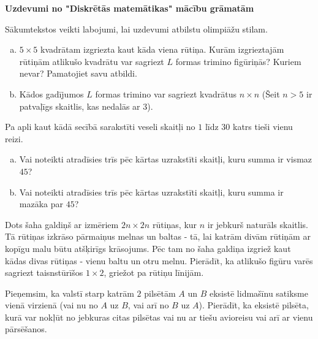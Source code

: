 \documentclass[11pt]{article}
\begin{document}
\newpage

\begin{center}
{\Large \bf Uzdevumi no "Diskrētās matemātikas" mācību grāmatām}
\end{center}

Sākumtekstos veikti labojumi, lai uzdevumi atbilstu olimpiāžu stilam.

\begin{problem}[SusannaEpp.Ch5.P32]
\begin{enumerate}[(a)]
\item $5 \times 5$ kvadrātam izgriezta kaut kāda viena rūtiņa. 
Kurām izgrieztajām rūtiņām atlikušo kvadrātu var sagriezt $L$ formas 
trimino figūriņās? Kuriem nevar? Pamatojiet savu atbildi. 
\item Kādos gadījumos $L$ formas trimino var sagriezt kvadrātus $n \times n$ (Šeit $n > 5$ 
ir patvaļīgs skaitlis, kas nedalās ar $3$). 
\end{enumerate}
\end{problem}

\begin{problem}[SusannaEpp.Ch5.P35]
Pa apli kaut kādā secībā sarakstīti veseli skaitļi no $1$ līdz $30$
katrs tieši vienu reizi. 
\begin{enumerate}[(a)]
\item Vai noteikti atradīsies trīs pēc kārtas uzrakstīti skaitļi, kuru summa ir vismaz $45$?
\item Vai noteikti atradīsies trīs pēc kārtas uzrakstīti skaitļi, kuru summa ir mazāka par $45$?
\end{enumerate}
\end{problem}

\begin{problem}[SusannaEpp.Ch5.P40]
Dots šaha galdiņš ar izmēriem $2n \times 2n$ rūtiņas, kur $n$ ir 
jebkurš naturāls skaitlis. Tā rūtiņas izkrāso pārmaiņus melnas un baltas - tā, lai 
katrām divām rūtiņām ar kopīgu malu būtu atšķirīgs krāsojums. 
Pēc tam no šaha galdiņa izgriež kaut kādas divas rūtiņas - vienu baltu un otru 
melnu. Pierādīt, ka atlikušo figūru varēs sagriezt taisnstūrīšos $1 \times 2$, 
griežot pa rūtiņu līnijām.
\end{problem}

\begin{problem}[Rosen2019.Ch5.P38]
Pieņemsim, ka valstī starp katrām $2$ pilsētām $A$ un $B$ eksistē lidmašīnu satiksme
vienā virzienā (vai nu no $A$ uz $B$, vai arī no $B$ uz $A$). 
Pierādīt, ka eksistē pilsēta, kurā var nokļūt no jebkuras citas pilsētas
vai nu ar tiešu avioreisu vai arī ar vienu pārsēšanos. 
\end{problem}
\end{document}
